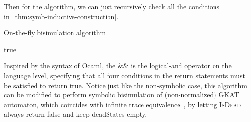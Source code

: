 \documentclass{extarticle}
\begin{document}
Then for the algorithm, we can just recursively check all the conditions in~\cref{thm:symb-inductive-construction}.

\begin{algorithm}
    \caption{On-the-fly bisimulation algorithm}\label{alg:bisim}
    \begin{algorithmic}
         {\Return true}
         {\Return {}} 
         {\Return {}} 
        \Else {}
        \EndIf
        \EndFunction
    \end{algorithmic}
\end{algorithm}

Inspired by the syntax of Ocaml, the \(\mathrel{\&\!\&}\) is the logical-and operator on the language level, specifying that all four conditions in the return statements must be satisfied to return true. 
Notice just like the non-symbolic case, this algorithm can be modified to perform symbolic bisimulation of (non-normalized) GKAT automaton, which coincides with infinite trace equivalence~\cite{schmid_GuardedKleeneAlgebra_2021}, by letting \textsc{IsDead} always return false and keep deadStates empty.
\end{document}
